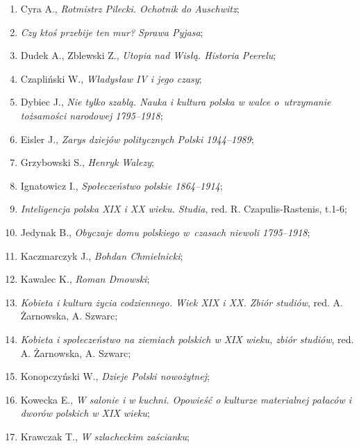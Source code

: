 \documentclass[a4paper,11pt]{article}
\begin{document}
\begin{enumerate}
\item Cyra A., \textit{Rotmistrz Pilecki. Ochotnik do Auschwitz};

\item \textit{Czy ktoś przebije ten mur? Sprawa Pyjasa};

\item Dudek A., Zblewski Z., \textit{Utopia nad Wisłą. Historia
    Peerelu};

\item Czapliński W., \textit{Władysław IV i jego czasy};

\item Dybiec J., \textit{Nie tylko szablą. Nauka i kultura polska w
    walce o~utrzymanie tożsamości narodowej 1795--1918};

\item Eisler J., \textit{Zarys dziejów politycznych Polski 1944--1989};

\item Grzybowski S., \textit{Henryk Walezy};

\item Ignatowicz I., \textit{Społeczeństwo polskie 1864--1914};

\item \textit{Inteligencja polska XIX i XX wieku. Studia}, red. R.
  Czapulis-Rastenis, t.1-6;

\item Jedynak B., \textit{Obyczaje domu polskiego w~czasach niewoli
    1795--1918};

\item Kaczmarczyk J., \textit{Bohdan Chmielnicki};

\item Kawalec K., \textit{Roman Dmowski};

\item \textit{Kobieta i kultura życia codziennego. Wiek XIX i XX. Zbiór
    studiów}, red. A. Żarnowska, A. Szwarc;

\item \textit{Kobieta i społeczeństwo na ziemiach polskich w XIX wieku,
    zbiór studiów}, red. A. Żarnowska, A. Szwarc;

\item Konopczyński W., \textit{Dzieje Polski nowożytnej};

\item Kowecka E., \textit{W salonie i w kuchni. Opowieść o kulturze
    materialnej pałaców i dworów polskich w XIX wieku};

\item Krawczak T., \textit{W szlacheckim zaścianku};


\end{enumerate}
\end{document}
